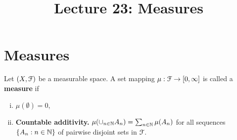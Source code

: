 \documentclass[a4paper,english,12pt]{article}
\title{Lecture 23: Measures}
\author{}
\begin{document}
\maketitle

\section{Measures}
\begin{defn}%
Let $(X, \mathcal{F})$ be a measurable space. A set mapping $\mu: \mathcal{F} \to [0, \infty]$ is called a \textbf{measure} if 
\begin{enumerate}[i.]
	\item $\mu (\emptyset) = 0$,
	\item \textbf{Countable additivity.} $\mu(\cup_{n \in \mathbb{N}}A_n) = \sum_{n \in \mathbb{N}} \mu(A_n)$ for all sequences $\{A_n: n \in \mathbb{N}\}$ of pairwise disjoint sets in $\mathcal{F}$.
\end{enumerate}
\end{defn}
\end{document}
